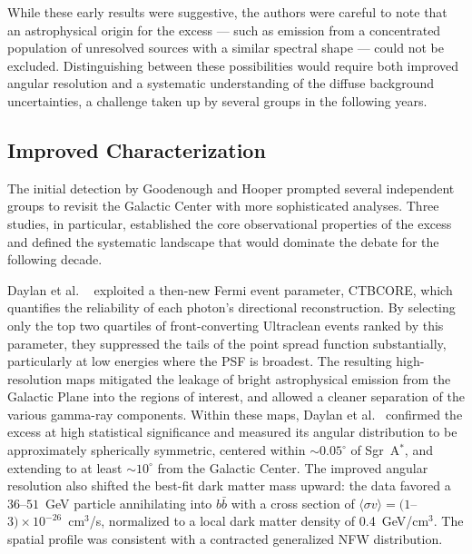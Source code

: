 While these early results were suggestive, the authors were careful to note that an astrophysical origin for the excess --- such as emission from a concentrated population of unresolved sources with a similar spectral shape --- could not be excluded.
Distinguishing between these possibilities would require both improved angular resolution and a systematic understanding of the diffuse background uncertainties, a challenge taken up by several groups in the following years.

\subsection{Improved Characterization}
\label{sec:4.2.2}

The initial detection by Goodenough and Hooper prompted several independent groups to revisit the Galactic Center with more sophisticated analyses.
Three studies, in particular, established the core observational properties of the excess and defined the systematic landscape that would dominate the debate for the following decade.

Daylan et al.
\ \cite{Daylan:2014rsa} exploited a then-new Fermi event parameter, CTBCORE, which quantifies the reliability of each photon's directional reconstruction.
By selecting only the top two quartiles of front-converting Ultraclean events ranked by this parameter, they suppressed the tails of the point spread function substantially, particularly at low energies where the PSF is broadest.
The resulting high-resolution maps mitigated the leakage of bright astrophysical emission from the Galactic Plane into the regions of interest, and allowed a cleaner separation of the various gamma-ray components.
Within these maps, Daylan et al.
\ confirmed the excess at high statistical significance and measured its angular distribution to be approximately spherically symmetric, centered within $\sim 0.05^\circ$ of Sgr~A$^*$, and extending to at least $\sim 10^\circ$ from the Galactic Center.
The improved angular resolution also shifted the best-fit dark matter mass upward: the data favored a $36$--$51$~GeV particle annihilating into $b\bar{b}$ with a cross section of $\langle \sigma v \rangle = (1$--$3) \times 10^{-26}$~cm$^3$/s, normalized to a local dark matter density of 0.4~GeV/cm$^3$.
The spatial profile was consistent with a contracted generalized NFW distribution.

